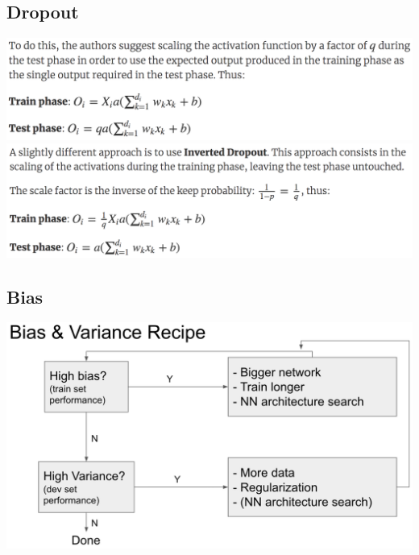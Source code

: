 \subsection*{Dropout}
\includegraphics[width=\linewidth]{dropout.png}
\includegraphics[width=\linewidth]{invdropout.png}

\subsection*{Bias}
\includegraphics[width=\linewidth]{biasvar.png}

